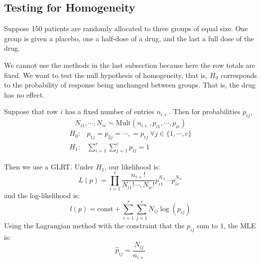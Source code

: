\documentclass[../Main.tex]{subfiles}
\begin{document}
\subsection{Testing for Homogeneity}
\begin{example}
    Suppose 150 patients are randomly allocated to three groups of equal size. One group is given a placebo, one a half-dose of a drug, and the last a full dose of the drug.

    We cannot use the methods in the last subsection because here the row totals are fixed. We want to test the null hypothesis of homogeneity, that is, $H_0$ corresponds to the probability of response being unchanged between groups. That is, the drug has no effect.

    Suppose that row $i$ has a fixed number of entries $n_{i+}$. Then for probabilities $p_{ij}$,
    \begin{equation*}
        N_{i1}, \cdots, N_{ic} \sim \text{Mult}(n_{i+}, p_{i1}, \cdots, p_{ic})
    \end{equation*}
    \begin{align*}
        H_0:& p_{1j} = p_{2j} = \cdots, = p_{rj}~\forall j \in \{1, \cdots, c\} \\
        H_1:& \sum_{i=1}^{r} \sum_{j=1}^{c} p_{ij} = 1
    \end{align*}

    Then we use a GLRT. Under $H_1$, our likelihood is:
    \begin{equation*}
        L(p) = \prod_{i=1}^{r} \frac{n_{i+}!}{N_{i1}! \cdots, N_{ic}!} p_{i1}^{N_{i1}} \cdots p_{ic}^{N_{ic}}
    \end{equation*}
    and the log-likelihood is:
    \begin{equation*}
        l(p) = \text{const} + \sum_{i=1}^{r} \sum_{j=1}^{c} N_{ij} \log(p_{ij})
    \end{equation*}
    Using the Lagrangian method with the constraint that the $p_{ij}$ sum to $1$, the MLE is:
    \begin{equation*}
        \hat{p}_{ij} = \frac{N_{ij}}{n_{i+}}
    \end{equation*}


\end{example}
\end{document}
